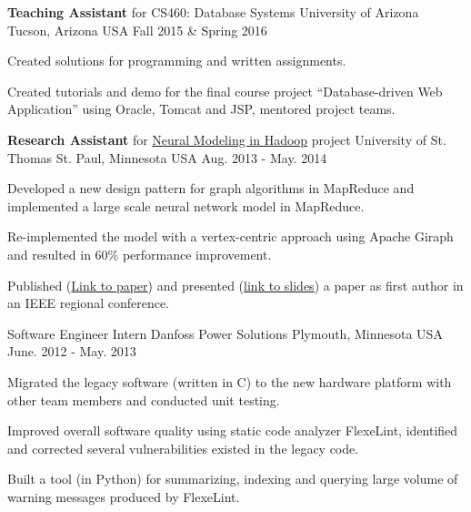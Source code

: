 \begin{cventries}
  \cventry
    {\textbf{Teaching Assistant} for CS460: Database Systems}
    {University of Arizona} %
    {Tucson, Arizona USA} %
    {Fall 2015 \& Spring 2016} %
    {
      \begin{cvitems} %
        \item {Created solutions for programming and written assignments.}
        \item {Created tutorials and demo for the final course project ``Database-driven Web
    Application'' using Oracle, Tomcat and JSP, mentored project teams.}
      \end{cvitems}
    }

  \cventry
    {\textbf{Research Assistant} for
    \href{http://imsure.github.io/NeuralGiraph/}{Neural Modeling in
    Hadoop} project}
    {University of St. Thomas} %
    {St. Paul, Minnesota USA} %
    {Aug. 2013 - May. 2014} %
    {
      \begin{cvitems} %
      \item {Developed a new design pattern for graph algorithms in
    MapReduce and implemented a large scale neural network
    model in MapReduce.}
      \item {Re-implemented the model with a vertex-centric approach
    using Apache Giraph and resulted in 60\% performance improvement.}
      \item
    {Published
    (\href{https://ieeexplore.ieee.org/document/6871824/}{Link to paper})
    and presented
    (\href{https://www.slideshare.net/imsure/ieee-eittalklargescaleneuralmodelinginmap-reducegiraph}{link
    to slides})
    a paper as first author in an IEEE regional conference.}
      \end{cvitems}
    }

  \cventry
    {Software Engineer Intern} %
    {Danfoss Power Solutions} %
    {Plymouth, Minnesota USA} %
    {June. 2012 - May. 2013} %
    {
      \begin{cvitems} %
        \item {Migrated the legacy software (written in C) to the new hardware
    platform with other team members and conducted unit testing.}
       \item {Improved overall software quality using static code analyzer FlexeLint, identified
    and corrected several vulnerabilities existed in the legacy code.}
           \item {Built a tool (in Python) for summarizing, indexing and
    querying large volume of warning messages produced by FlexeLint.}
      \end{cvitems}
    }


\end{cventries}
